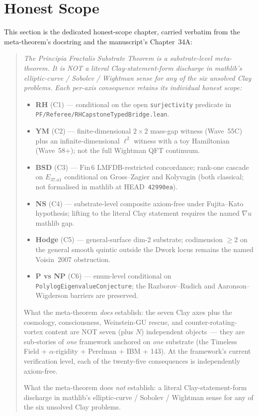 \documentclass[11pt,a4paper]{article}
\theoremstyle{definition}
\theoremstyle{remark}
\newcommand{\lean}[1]{\texttt{\small #1}}
\begin{document}
\section{Honest Scope}
\label{sec:honest-scope}

This section is the dedicated honest-scope chapter, carried
verbatim from the meta-theorem's docstring and the manuscript's
Chapter~34A:

\medskip
\begin{quote}
\itshape
The Principia Fractalis Substrate Theorem is a substrate-level
meta-theorem. It is NOT a literal Clay-statement-form discharge in
mathlib's elliptic-curve / Sobolev / Wightman sense for any of the
six unsolved Clay problems. Each per-axis consequence retains its
individual honest scope:
\begin{itemize}
\item \textbf{RH} (C1) --- conditional on the open
\lean{surjectivity} predicate in
\lean{PF/Referee/RHCapstoneTypedBridge.lean}.
\item \textbf{YM} (C2) --- finite-dimensional $2 \times 2$ mass-gap
witness (Wave~55C) plus an infinite-dimensional $\ell^{2}$
witness with a toy Hamiltonian (Wave~58+); not the full Wightman
QFT continuum.
\item \textbf{BSD} (C3) --- $\mathrm{Fin}\,6$ LMFDB-restricted
concordance; rank-one cascade on $E_{37.a1}$ conditional on
Gross--Zagier and Kolyvagin (both classical; not formalised in
mathlib at HEAD~\texttt{42990ea}).
\item \textbf{NS} (C4) --- substrate-level composite axiom-free
under Fujita--Kato hypothesis; lifting to the literal Clay
statement requires the named $\nabla u$ mathlib gap.
\item \textbf{Hodge} (C5) --- general-surface dim-2 substrate;
codimension $\ge 2$ on the general smooth quintic outside the
Dwork locus remains the named Voisin~2007 obstruction.
\item \textbf{P vs NP} (C6) --- enum-level conditional on
\lean{PolylogEigenvalueConjecture}; the Razborov--Rudich and
Aaronson--Wigderson barriers are preserved.
\end{itemize}
What the meta-theorem \emph{does} establish: the seven Clay axes
plus the cosmology, consciousness, Weinstein-GU rescue, and
counter-rotating-vortex content are NOT seven (plus $N$)
independent objects~--- they are sub-stories of \emph{one}
framework anchored on \emph{one} substrate (the Timeless Field
+ $\alpha$-rigidity + Perelman + IBM + 143). At the framework's
current verification level, each of the twenty-five consequences
is independently axiom-free.

What the meta-theorem does \emph{not} establish: a literal
Clay-statement-form discharge in mathlib's elliptic-curve /
Sobolev / Wightman sense for any of the six unsolved Clay
problems.
\end{quote}
\medskip
\end{document}
